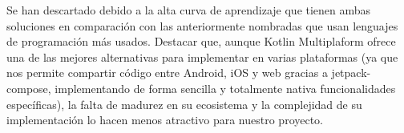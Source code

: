Se han descartado debido a la alta curva de aprendizaje que tienen ambas soluciones en comparación con las anteriormente nombradas que usan lenguajes de programación más usados. Destacar que, aunque Kotlin Multiplaform ofrece una de las mejores alternativas para implementar en varias plataformas (ya que nos permite compartir código entre Android, iOS y web gracias a \gls{jetpack-compose}, implementando de forma sencilla y totalmente nativa funcionalidades específicas), la falta de madurez en su ecosistema y la complejidad de su implementación lo hacen menos atractivo para nuestro proyecto.
